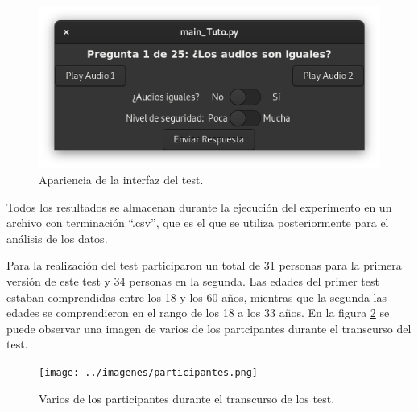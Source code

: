 \documentclass[11pt,a4paper,twoside]{book}
\begin{document}
                    \begin{figure}[H]
                        \includegraphics[scale=0.6]{../imagenes/interFin.png}
			            \centering
			            \caption{Apariencia de la interfaz del test.}
			            \label{fig:interfazTestFin}
                    \end{figure}
                
                    Todos los resultados se almacenan durante la ejecución del experimento en un archivo con terminación ``.csv'', que es el que se utiliza posteriormente para el análisis de los datos.
                
                    Para la realización del test participaron un total de 31 personas para la primera versión de este test y 34 personas en la segunda. Las edades del primer test estaban comprendidas entre los 18 y los 60 años, mientras que la segunda las edades se comprendieron en el rango de los 18 a los 33 años. En la figura \ref{fig:participantes} se puede observar una imagen de varios de los partcipantes durante el transcurso del test.
                
                    \begin{figure}
                        \texttt{[image: ../imagenes/participantes.png]}
			            \centering
			            \caption{Varios de los participantes durante el transcurso de los test.}
			            \label{fig:participantes}
                    \end{figure}
            
            


\end{document}

